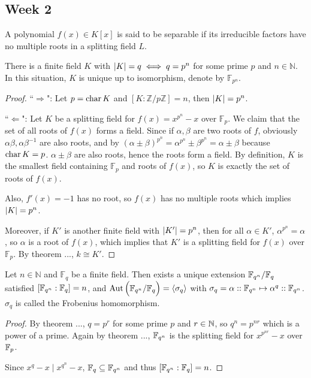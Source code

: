 \subsection{Week 2}

\begin{definition}
  A polynomial $f(x) \in K[x]$ is said to be separable if its irreducible factors have no multiple roots in a splitting
  field $L$.
\end{definition}

\begin{theorem}
  There is a finite field $K$ with $\lvert K\rvert = q \iff q = p^n$ for some prime $p$ and $n \in \mathbb{N}$.
  In this situation, $K$ is unique up to isomorphism, denote by $\mathbb{F}_{p^n}$.

  \begin{proof}
    ``$\Rightarrow$": Let $p = \operatorname{char} K$ and $[K : \mathbb{Z}/ p\mathbb{Z}] = n$, then $\lvert K\rvert = p^n$.

    ``$\Leftarrow$": Let $K$ be a splitting field for $f(x) = x^{p^n} - x$ over $\mathbb{F}_p$.
    We claim that the set of all roots of $f(x)$ forms a field. Since if $\alpha, \beta$ are
    two roots of $f$, obviously $\alpha \beta, \alpha \beta^{-1}$ are also roots,
    and by $(\alpha \pm \beta)^{p^n} = \alpha^{p^n} \pm \beta^{p^n} = \alpha \pm \beta$ because
    $\operatorname{char} K = p$.
    $\alpha \pm \beta$ are also roots, hence the roots form a field. By definition, $K$
    is the smallest field containing $\mathbb{F}_p$ and roots of $f(x)$, so
    $K$ is exactly the set of roots of $f(x)$.

    Also, $f'(x) = -1$ has no root, so $f(x)$ has no multiple roots which implies $\lvert K\rvert = p^n$.

    Moreover, if $K'$ is another finite field with $\lvert K'\rvert = p^n$, then for all $\alpha \in K'$,
    $\alpha^{p^n} = \alpha$, so $\alpha$ is a root of $f(x)$, which implies that $K'$ is
    a splitting field for $f(x)$ over $\mathbb{F}_p$. By theorem ..., $k \cong K'$.
  \end{proof}
\end{theorem}

\begin{theorem}
  Let $n \in \mathbb{N}$ and $\mathbb{F}_q$ be a finite field. Then exists a unique extension
  $\mathbb{F}_{q^n} / \mathbb{F}_q$ satisfied $[\mathbb{F}_{q^n} : \mathbb{F}_q] = n$, and $\operatorname{Aut} \Big( \mathbb{F}_{q^n} / \mathbb{F}_q \Big) =
  \langle \sigma_q \rangle$ with $\sigma_q = \alpha :: \mathbb{F}_{q^n} \mapsto \alpha^q :: \mathbb{F}_{q^n}$.
  $\sigma_q$ is called the Frobenius homomorphism.

  \begin{proof}
    By theorem ..., $q = p^r$ for some prime $p$ and $r \in \mathbb{N}$, so $q^n = p^{nr}$ which is a power of
    a prime. Again by theorem ..., $\mathbb{F}_{q^n}$ is the splitting field for $x^{p^{nr}} - x$ over $\mathbb{F}_p$.

    Since $x^q - x \mid x^{q^n} - x$, $\mathbb{F}_q \subseteq \mathbb{F}_{q^n}$ and thus $[\mathbb{F}_{q^n}: \mathbb{F}_{q}] = n$. 
  \end{proof}
\end{theorem}

